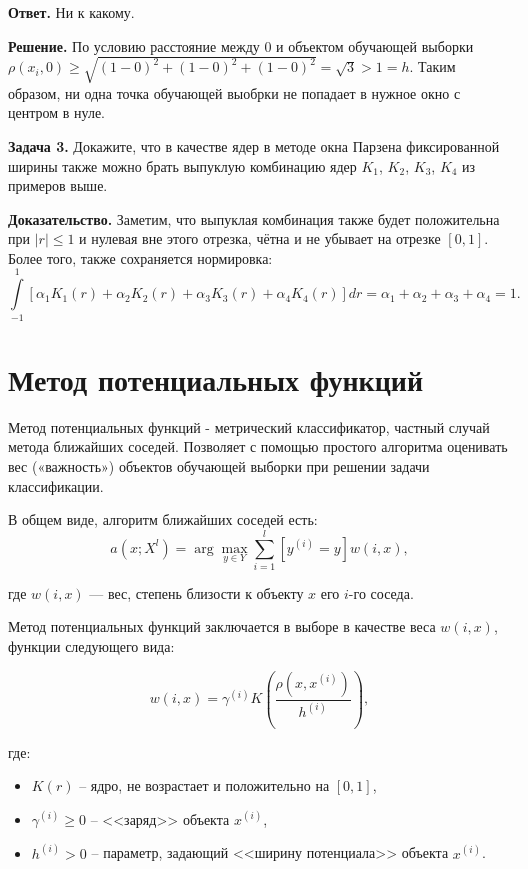 \textbf{Ответ.} Ни к какому.

\textbf{Решение.} По условию расстояние между $0$ и объектом обучающей выборки $\rho(x_i,0)\ge\sqrt{(1-0)^2+(1-0)^2+(1-0)^2} = \sqrt{3} > 1 = h$. Таким образом, ни одна точка обучающей выобрки не попадает в нужное окно с центром в нуле.

\textbf{Задача 3.} Докажите, что в качестве ядер в методе окна Парзена фиксированной ширины также можно брать выпуклую комбинацию ядер $K_1$, $K_2$, $K_3$, $K_4$ из примеров выше.

\textbf{Доказательство.} Заметим, что выпуклая комбинация также будет положительна при $|r|\le 1$ и нулевая вне этого отрезка, чётна и не убывает на отрезке $[0,1]$. Более того, также сохраняется нормировка: 
\begin{equation*}
	\displaystyle\int\limits_{-1}^{1}\left[\alpha_1K_1(r)+\alpha_2K_2(r) +\alpha_3K_3(r)+\alpha_4K_4(r)\right]dr = \alpha_1 + \alpha_2 +\alpha_3 +\alpha_4 =1.
\end{equation*}

\section{Метод потенциальных функций}

Метод потенциальных функций - метрический классификатор, частный случай метода ближайших соседей. Позволяет с помощью простого алгоритма оценивать вес («важность») объектов обучающей выборки при решении задачи классификации.

В общем виде, алгоритм ближайших соседей есть:
\begin{equation*}
	\displaystyle a(x; X^l) = \arg\max_{y\in Y} \sum\limits_{i=1}^l[y^{(i)}=y]w(i,x), 
\end{equation*}

где $w(i,x)$ — вес, степень близости к объекту $x$ его $i$-го соседа.

Метод потенциальных функций заключается в выборе в качестве веса $w(i,x)$, функции следующего вида:

\begin{equation*}
	\displaystyle w(i,x) = \gamma^{(i)} K\left(\frac{\rho(x, x^{(i)})}{h^{(i)}}\right),
\end{equation*}

где:

\begin{itemize}
	\item $K(r)$ -- ядро, не возрастает и положительно на $[0, 1]$,
	\item $\gamma^{(i)} \ge 0$ -- <<заряд>> объекта $x^{(i)}$, 
	\item $h^{(i)} > 0$ -- параметр, задающий <<ширину потенциала>> объекта $x^{(i)}$. 
\end{itemize}

